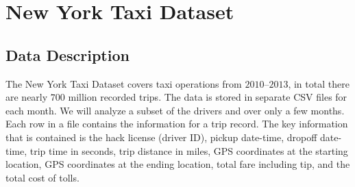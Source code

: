 \documentclass{article}
\begin{document}


\section{New York Taxi Dataset}\label{sec:taxi}
\subsection{Data Description}
The New York Taxi Dataset covers taxi operations from $2010$--$2013$, in total there are nearly $700$ million recorded trips. The data is stored in separate CSV files for each month. We will analyze a subset of the drivers and over only a few months. Each row in a file contains the information for a trip record. The key information that is contained is the hack license (driver ID), pickup date-time, dropoff date-time, trip time in seconds, trip distance in miles, GPS coordinates at the starting location, GPS coordinates at the ending location, total fare including tip, and the total cost of tolls.
\end{document}
